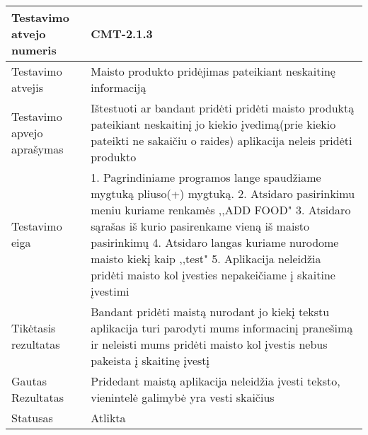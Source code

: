 \documentclass[oneside]{VUMIFPSkursinis}
\begin{document}
\begin{center}
    \begin{tabular}{ |p{5cm}|p{13cm}|}
    \hline
    	Testavimo atvejo numeris & CMT-2.1.3 \\ \hline
    	Testavimo atvejis & Maisto produkto pridėjimas pateikiant neskaitinę informaciją \\ \hline
	Testavimo apvejo aprašymas & Ištestuoti ar bandant pridėti pridėti maisto produktą pateikiant neskaitinį jo kiekio įvedimą(prie kiekio pateikti ne sakaičiu o raides) aplikacija neleis pridėti produkto  \\ \hline
	Testavimo eiga & 1. Pagrindiniame programos lange spaudžiame mygtuką pliuso(+) mygtuką. 
				2. Atsidaro pasirinkimu meniu kuriame renkamės ,,ADD FOOD"
				3. Atsidaro sąrašas iš kurio pasirenkame vieną iš maisto pasirinkimų
				4. Atsidaro langas kuriame nurodome maisto kiekį kaip ,,test"
				5. Aplikacija neleidžia pridėti maisto kol įvesties nepakeičiame į skaitine įvestimi \\ \hline
	Tikėtasis rezultatas & Bandant pridėti maistą nurodant jo kiekį tekstu aplikacija turi parodyti mums informacinį pranešimą ir neleisti mums pridėti maisto kol įvestis nebus pakeista į skaitinę įvestį \\ \hline
	Gautas Rezultatas & Pridedant maistą aplikacija neleidžia įvesti teksto, vienintelė galimybė yra vesti skaičius \\ \hline
	Statusas & Atlikta \\ \hline
    \hline
    \end{tabular}
\end{center}
\end{document}

